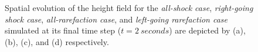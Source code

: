 \documentclass[11pt,a4paper]{article}
\begin{document}
\begin{figure}[H]%
	\centering
	\quad
	
	\quad
	\caption{Spatial evolution of the height field for the {\em all-shock case},  {\em right-going shock case}, {\em all-rarefaction case},  and {\em left-going rarefaction case} simulated  at its final time step ($t=2~seconds$) are depicted by (a), (b), (c), and (d) respectively.}
	\label{hor1}
\end{figure}
\end{document}
